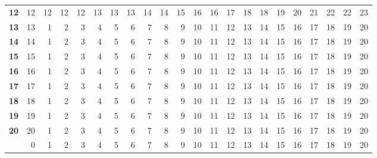 \documentclass[10pt]{article}
\begin{document}
\begin{table}[ht]
\begin{tabu}{|>{\bfseries}l|rrr|rrr|rrr|rrr|rrr|rrr|rrr|}
    12 & 12 & 12 & 12 & 12 & 13 & 13 & 13 & 14 & 14 & 15 & 16 & 16 & 17 & 18 & 18 & 19 & 20 & 21 & 22 & 22 & 23\\
    13 & 13 & 1 & 2 & 3 & 4 & 5 & 6 & 7 & 8 & 9 & 10 & 11 & 12 & 13 & 14 & 15 & 16 & 17 & 18 & 19 & 20\\
    14 & 14 & 1 & 2 & 3 & 4 & 5 & 6 & 7 & 8 & 9 & 10 & 11 & 12 & 13 & 14 & 15 & 16 & 17 & 18 & 19 & 20\\

    15 & 15 & 1 & 2 & 3 & 4 & 5 & 6 & 7 & 8 & 9 & 10 & 11 & 12 & 13 & 14 & 15 & 16 & 17 & 18 & 19 & 20\\
    16 & 16 & 1 & 2 & 3 & 4 & 5 & 6 & 7 & 8 & 9 & 10 & 11 & 12 & 13 & 14 & 15 & 16 & 17 & 18 & 19 & 20\\
    17 & 17 & 1 & 2 & 3 & 4 & 5 & 6 & 7 & 8 & 9 & 10 & 11 & 12 & 13 & 14 & 15 & 16 & 17 & 18 & 19 & 20\\

    18 & 18 & 1 & 2 & 3 & 4 & 5 & 6 & 7 & 8 & 9 & 10 & 11 & 12 & 13 & 14 & 15 & 16 & 17 & 18 & 19 & 20\\
    19 & 19 & 1 & 2 & 3 & 4 & 5 & 6 & 7 & 8 & 9 & 10 & 11 & 12 & 13 & 14 & 15 & 16 & 17 & 18 & 19 & 20\\
    20 & 20 & 1 & 2 & 3 & 4 & 5 & 6 & 7 & 8 & 9 & 10 & 11 & 12 & 13 & 14 & 15 & 16 & 17 & 18 & 19 & 20\\

    \rowfont{\bfseries}
       & 0 & 1 & 2 & 3 & 4 & 5 & 6 & 7 & 8 & 9 & 10 & 11 & 12 & 13 & 14 & 15 & 16 & 17 & 18 & 19 & 20\\\hline

    \hline
  \end{tabu}
\end{table}
\end{document}
